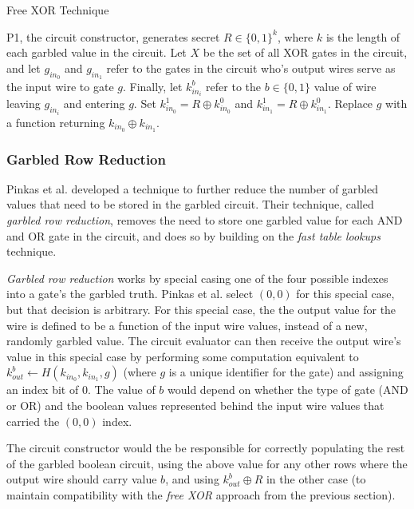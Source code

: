 \begin{algorithm}[H]
    \caption{Free XOR Technique}
    \label{alg:freexor}
    \begin{algorithmic}[1]
        \STATE \ac{P1}, the circuit constructor, generates secret $R \in \{0, 1\}^{k}$, where $k$ is the length of each garbled value in the circuit.
        \STATE Let $X$ be the set of all XOR gates in the circuit, and let $g_{in_0}$ and $g_{in_1}$ refer to the gates in the circuit who's output wires serve as the input wire to gate $g$. Finally, let $k^b_{in_i}$ refer to the $b \in \{0, 1\}$ value of wire leaving $g_{in_i}$ and entering $g$.
            \STATE Set $k^1_{in_0} =  R \oplus k^0_{in_0}$ and $k^1_{in_1} =  R \oplus k^0_{in_1}$.
            \STATE Replace $g$ with a function returning $k_{in_0} \oplus k_{in_1}$.
        \ENDFOR
    \end{algorithmic}
\end{algorithm}


\subsubsection{Garbled Row Reduction}
\label{sec:grr}

Pinkas et al.\cite{pinkas2009secure} developed a technique to further reduce the number of garbled values that need to be stored in the garbled circuit.  Their technique, called \emph{garbled row reduction}, removes the need to store one garbled value for each AND and OR gate in the circuit, and does so by building on the \emph{fast table lookups} technique.

\emph{Garbled row reduction} works by special casing one of the four possible indexes into a gate's the garbled truth.  Pinkas et al. select $(0, 0)$ for this special case, but that decision is arbitrary.  For this special case, the the output value for the wire is defined to be a function of the input wire values, instead of a new, randomly garbled value. The circuit evaluator can then receive the output wire's value in this special case by performing some computation equivalent to $k^b_{out} \gets H(k_{in_0}, k_{in_1}, g)$ (where $g$ is a unique identifier for the gate) and assigning an index bit of 0. The value of $b$ would depend on whether the type of gate (AND or OR) and the boolean values represented behind the input wire values that carried the $(0, 0)$ index.

The circuit constructor would the be responsible for correctly populating the rest of the garbled boolean circuit, using the above value for any other rows where the output wire should carry value $b$, and using $k^b_{out} \oplus R$ in the other case (to maintain compatibility with the \emph{free XOR} approach from the previous section).


